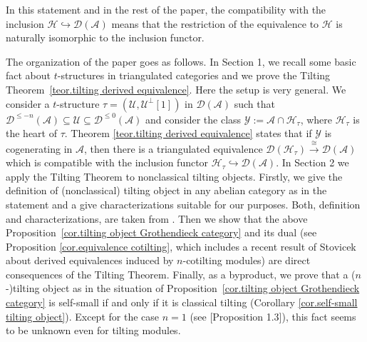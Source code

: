 \documentclass{proc-l}
\theoremstyle{definition}
\theoremstyle{remark}
\numberwithin{equation}{section}
\begin{document}
In this statement and in the rest of the paper, the compatibility with the inclusion $\mathcal{H}\hookrightarrow\mathcal{D}(\mathcal{A})$ means that the restriction of the equivalence to $\mathcal{H}$ is naturally isomorphic to the inclusion functor. 
\vspace*{0.3cm}

The organization of the paper goes as follows. In Section 1, we recall some basic fact about $t$-structures in triangulated categories and we prove the Tilting Theorem~\ref{teor.tilting derived equivalence}. Here the setup is very general. We consider a 
$t$-structure $\tau =(\mathcal{U},\mathcal{U}^\perp [1])$ in $\mathcal{D}(\mathcal{A})$ such that $\mathcal{D}^{\leq -n}(\mathcal{A})\subseteq\mathcal{U}\subseteq\mathcal{D}^{\leq 0}(\mathcal{A})$ and consider the class $\mathcal{Y}:=\mathcal{A}\cap\mathcal{H}_\tau$, where $\mathcal{H}_\tau$ is the heart of $\tau$. Theorem \ref{teor.tilting derived equivalence} states that if $\mathcal{Y}$ is cogenerating in $\mathcal{A}$, then there is a triangulated equivalence $\mathcal{D}(\mathcal{H}_\tau)\stackrel{\cong}{\longrightarrow}\mathcal{D}(\mathcal{A})$ which is compatible with the inclusion functor $\mathcal{H}_\tau\hookrightarrow\mathcal{D}(\mathcal{A})$.
In Section 2 we apply the Tilting Theorem to nonclassical tilting objects. Firstly, we give the definition of (nonclassical) tilting object in any abelian category as in the statement and a give characterizations suitable for our purposes. Both, definition and characterizations, are taken from  \cite{NSZM}. Then we show that the above Proposition~\ref{cor.tilting object Grothendieck category} and its dual (see Proposition \ref{cor.equivalence cotilting}, which includes a recent result of Stovicek about derived equivalences induced by $n$-cotilting modules) are direct consequences of the Tilting Theorem. Finally, as a byproduct, we prove that a ($n$-)tilting object as in the situation of Proposition~\ref{cor.tilting object Grothendieck category} is self-small if and only if it is classical tilting (Corollary \ref{cor.self-small tilting object}).  Except for the case $n=1$ (see \cite{CT}[Proposition 1.3]), this fact seems to be unknown even for tilting modules. 
\end{document}
